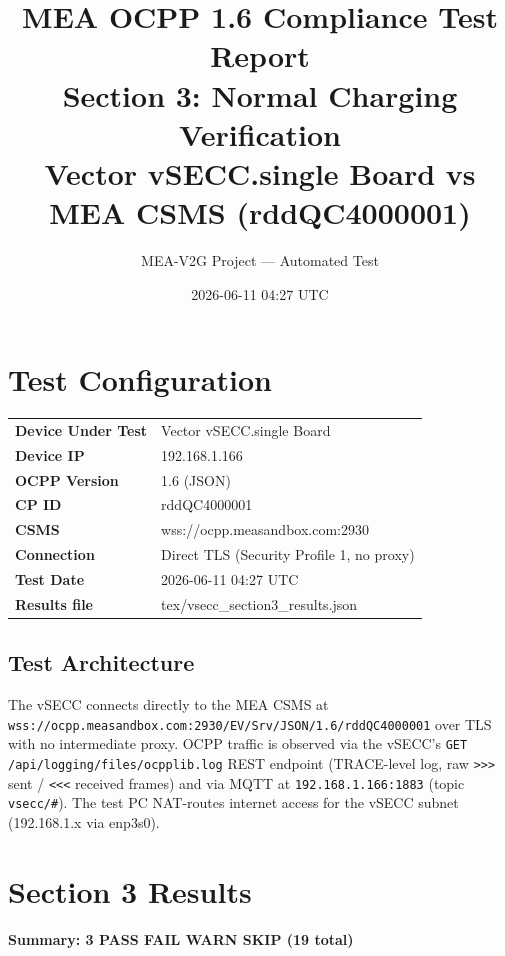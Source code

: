 \documentclass[10pt, a4paper]{article}
\title{\textbf{MEA OCPP 1.6 Compliance Test Report}\\[0.3em]
\large Section 3: Normal Charging Verification\\[0.3em]
\normalsize Vector vSECC.single Board vs MEA CSMS (rddQC4000001)}
\author{MEA-V2G Project --- Automated Test}
\date{2026-06-11 04:27 UTC}
\begin{document}
\maketitle
\tableofcontents
\newpage

\section{Test Configuration}
\begin{tabular}{ll}
\textbf{Device Under Test} & Vector vSECC.single Board \\
\textbf{Device IP}         & 192.168.1.166 \\
\textbf{OCPP Version}      & 1.6 (JSON) \\
\textbf{CP ID}             & rddQC4000001 \\
\textbf{CSMS}              & wss://ocpp.measandbox.com:2930 \\
\textbf{Connection}        & Direct TLS (Security Profile 1, no proxy) \\
\textbf{Test Date}         & 2026-06-11 04:27 UTC \\
\textbf{Results file}      & tex/vsecc\_section3\_results.json \\
\end{tabular}

\subsection*{Test Architecture}
The vSECC connects directly to the MEA CSMS at
\texttt{wss://ocpp.measandbox.com:2930/EV/Srv/JSON/1.6/rddQC4000001}
over TLS with no intermediate proxy.
OCPP traffic is observed via the vSECC's \texttt{GET /api/logging/files/ocpplib.log}
REST endpoint (TRACE-level log, raw \texttt{>>>} sent / \texttt{<<<} received frames)
and via MQTT at \texttt{192.168.1.166:1883} (topic \texttt{vsecc/\#}).
The test PC NAT-routes internet access for the vSECC subnet (192.168.1.x via enp3s0).

\section{Section 3 Results}
\textbf{Summary: 3 PASS  FAIL  WARN  SKIP \quad (19 total)}
\end{document}
